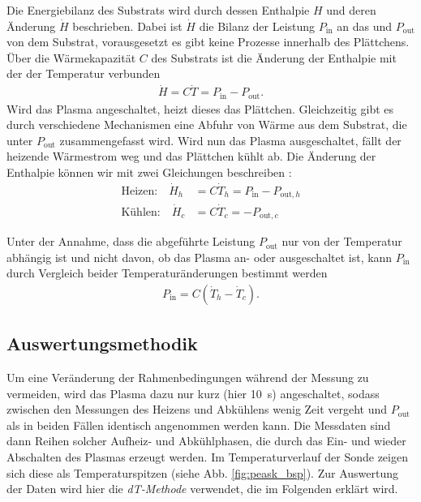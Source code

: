 Die Energiebilanz des Substrats wird durch dessen Enthalpie $ H $ und deren Änderung $ \dot{H} $ beschrieben. Dabei ist $ \dot{H} $ die Bilanz der Leistung $ P_\text{in} $ an das und $ P_\text{out} $ von dem Substrat, vorausgesetzt es gibt keine Prozesse innerhalb des Plättchens. Über die Wärmekapazität $ C $ des Substrats ist die Änderung der Enthalpie mit der der Temperatur verbunden \cite{gauterCalorimetricInvestigationPlasma2018}
\begin{align*}
\dot{	H} = C \dot{T} = P_\text{in} - P_\text{out}.
\end{align*}
Wird das Plasma angeschaltet, heizt dieses das Plättchen. Gleichzeitig gibt es durch verschiedene Mechanismen eine  Abfuhr von Wärme aus dem Substrat, die unter $ P_\text{out} $ zusammengefasst wird. Wird nun das Plasma ausgeschaltet, fällt der heizende Wärmestrom weg und das Plättchen kühlt ab. Die Änderung der Enthalpie können wir mit zwei Gleichungen beschreiben \cite{gauterCalorimetricInvestigationPlasma2018}:
\begin{align*}
	\text{Heizen:}\quad \dot{H}_h &= C \dot{T}_h = P_\text{in} - P_{\text{out},h}\\
	\text{Kühlen:}\quad \dot{H}_c &= C \dot{T}_c =- P_{\text{out},c}
\end{align*}

Unter der Annahme, dass die abgeführte Leistung $ P_\text{out} $ nur von der Temperatur abhängig ist und nicht davon, ob das Plasma an- oder ausgeschaltet ist, kann $ P_\text{in} $ durch Vergleich beider Temperaturänderungen bestimmt werden \cite{thorntonSubstrateHeatingCylindrical1978}
\begin{align*}
	P_\text{in} = C( \dot{T}_h - \dot{T}_c).
\end{align*}

\subsection{Auswertungsmethodik}


Um eine Veränderung der Rahmenbedingungen während der Messung zu vermeiden, wird das Plasma dazu nur kurz (hier \qty{10}{\second}) angeschaltet, sodass zwischen den Messungen des Heizens und Abkühlens wenig Zeit vergeht und $ P_\text{out} $ als in beiden Fällen identisch angenommen werden kann. Die Messdaten sind dann Reihen solcher Aufheiz- und Abkühlphasen, die durch das Ein- und wieder Abschalten des Plasmas erzeugt werden. Im Temperaturverlauf der Sonde zeigen sich diese als Temperaturspitzen (siehe Abb. \ref{fig:peask_bsp}). Zur Auswertung der Daten wird hier die \textit{dT-Methode} \cite{rosenfeldtUsePassiveThermal2021,gauterCalorimetricInvestigationPlasma2018,hansenEnergyFluxMeasurements2019,hansenUnderstandingEnergyBalance2021} verwendet, die im Folgenden erklärt wird.\\

